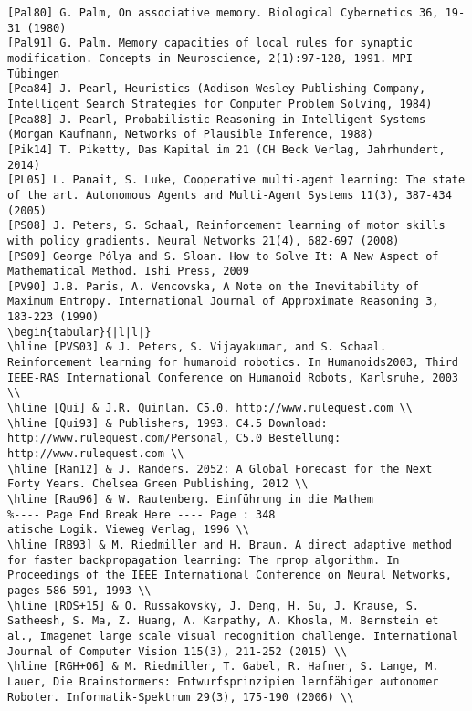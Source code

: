 \documentclass[10pt]{article}
\begin{document}
\begin{verbatim}
[Pal80] G. Palm, On associative memory. Biological Cybernetics 36, 19-31 (1980)
[Pal91] G. Palm. Memory capacities of local rules for synaptic modification. Concepts in Neuroscience, 2(1):97-128, 1991. MPI Tübingen
[Pea84] J. Pearl, Heuristics (Addison-Wesley Publishing Company, Intelligent Search Strategies for Computer Problem Solving, 1984)
[Pea88] J. Pearl, Probabilistic Reasoning in Intelligent Systems (Morgan Kaufmann, Networks of Plausible Inference, 1988)
[Pik14] T. Piketty, Das Kapital im 21 (CH Beck Verlag, Jahrhundert, 2014)
[PL05] L. Panait, S. Luke, Cooperative multi-agent learning: The state of the art. Autonomous Agents and Multi-Agent Systems 11(3), 387-434 (2005)
[PS08] J. Peters, S. Schaal, Reinforcement learning of motor skills with policy gradients. Neural Networks 21(4), 682-697 (2008)
[PS09] George Pólya and S. Sloan. How to Solve It: A New Aspect of Mathematical Method. Ishi Press, 2009
[PV90] J.B. Paris, A. Vencovska, A Note on the Inevitability of Maximum Entropy. International Journal of Approximate Reasoning 3, 183-223 (1990)
\begin{tabular}{|l|l|}
\hline [PVS03] & J. Peters, S. Vijayakumar, and S. Schaal. Reinforcement learning for humanoid robotics. In Humanoids2003, Third IEEE-RAS International Conference on Humanoid Robots, Karlsruhe, 2003 \\
\hline [Qui] & J.R. Quinlan. C5.0. http://www.rulequest.com \\
\hline [Qui93] & Publishers, 1993. C4.5 Download: http://www.rulequest.com/Personal, C5.0 Bestellung: http://www.rulequest.com \\
\hline [Ran12] & J. Randers. 2052: A Global Forecast for the Next Forty Years. Chelsea Green Publishing, 2012 \\
\hline [Rau96] & W. Rautenberg. Einführung in die Mathem
%---- Page End Break Here ---- Page : 348
atische Logik. Vieweg Verlag, 1996 \\
\hline [RB93] & M. Riedmiller and H. Braun. A direct adaptive method for faster backpropagation learning: The rprop algorithm. In Proceedings of the IEEE International Conference on Neural Networks, pages 586-591, 1993 \\
\hline [RDS+15] & O. Russakovsky, J. Deng, H. Su, J. Krause, S. Satheesh, S. Ma, Z. Huang, A. Karpathy, A. Khosla, M. Bernstein et al., Imagenet large scale visual recognition challenge. International Journal of Computer Vision 115(3), 211-252 (2015) \\
\hline [RGH+06] & M. Riedmiller, T. Gabel, R. Hafner, S. Lange, M. Lauer, Die Brainstormers: Entwurfsprinzipien lernfähiger autonomer Roboter. Informatik-Spektrum 29(3), 175-190 (2006) \\

\end{verbatim}
\end{document}
